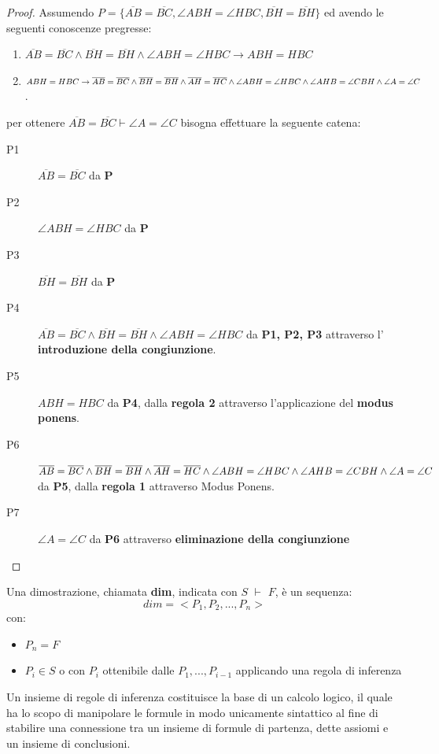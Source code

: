 \begin{proof}
Assumendo $P = \{ \overline{AB} = \overline{BC}, \angle ABH = \angle HBC, \overline{BH} = \overline{BH} \}$
ed avendo le seguenti conoscenze pregresse:
\begin{enumerate}
\item $\overline{AB}=\overline{BC} \land \overline{BH}=\overline{BH} \land \angle ABH = \angle HBC \rightarrow  ABH = HBC$
\item $ABH = HBC \rightarrow \overline{AB}=\overline{BC} \land \overline{BH}=\overline{BH} \land \overline{AH}=\overline{HC}
        \land \newline \angle ABH = \angle HBC \land \angle AHB = \angle CBH \land \angle A=\angle C$.
\end{enumerate}
per ottenere $\overline{AB} = \overline{BC} \vdash \angle A = \angle C$ bisogna effettuare la seguente catena:
\begin{description}
\item [P1] $\overline{AB}=\overline{BC}$  da \textbf{P}
\item [P2] $\angle ABH = \angle HBC$  da \textbf{P}
\item [P3] $\overline{BH}=\overline{BH}$  da \textbf{P}
\item [P4] $\overline{AB} = \overline{BC} \land \overline{BH} = \overline{BH} \land \angle ABH = \angle HBC$
       da \textbf{P1, P2, P3} attraverso l' \textbf{introduzione della congiunzione}.
\item [P5] $ABH = HBC$ da \textbf{P4}, dalla \textbf{regola 2}  attraverso l'applicazione del \textbf{modus ponens}.
\item [P6] $\overline{AB} = \overline{BC} \land \overline{BH} = \overline{BH} \land \overline{AH} = \overline{HC} \land \newline
  \angle ABH = \angle HBC \land \angle AHB = \angle CBH \land \angle A=\angle C$ da \textbf{P5}, dalla \textbf{regola 1} attraverso Modus Ponens.
\item [P7] $\angle A=\angle C$ da \textbf{P6} attraverso \textbf{eliminazione della congiunzione}
\end{description}
\end{proof}
\begin{defi}
  Una dimostrazione, chiamata \textbf{dim}, indicata con $S\,\,\vdash\,\, F$, è un sequenza:
\begin{equation*}
  dim=<P_1,P_2,...,P_n>
\end{equation*}
con:
\begin{itemize}
\item $P_n=F$
\item $P_i \in S$ o con $P_i$ ottenibile dalle $P_1,...,P_{i-1}$ applicando una regola di inferenza
\end{itemize}
\end{defi}
Un insieme di regole di inferenza costituisce la base di un calcolo logico, il quale ha lo scopo di manipolare le formule in modo
unicamente sintattico al fine di stabilire una connessione tra un insieme di formule di partenza, dette assiomi e un insieme di conclusioni.

